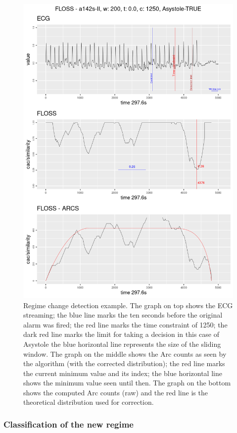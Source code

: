 \documentclass[runningheads]{llncs}
\begin{document}
\begin{figure}

{\centering \includegraphics[width=0.8\linewidth,height=0.8\textheight]{../../docs/figure/floss_regime} 

}

\caption{Regime change detection example. The graph on top shows the ECG streaming; the blue line marks the ten seconds before the original alarm was fired; the red line marks the time constraint of 1250; the dark red line marks the limit for taking a decision in this case of Asystole the blue horizontal line represents the size of the sliding window. The graph on the middle shows the Arc counts as seen by the algorithm (with the corrected distribution); the red line marks the current minimum value and its index; the blue horizontal line shows the minimum value seen until then. The graph on the bottom shows the computed Arc counts (raw) and the red line is the theoretical distribution used for correction.}\label{fig:flossregime}
\end{figure}

\hypertarget{classregime}{%
\subsubsection{Classification of the new regime}\label{classregime}}
\end{document}
